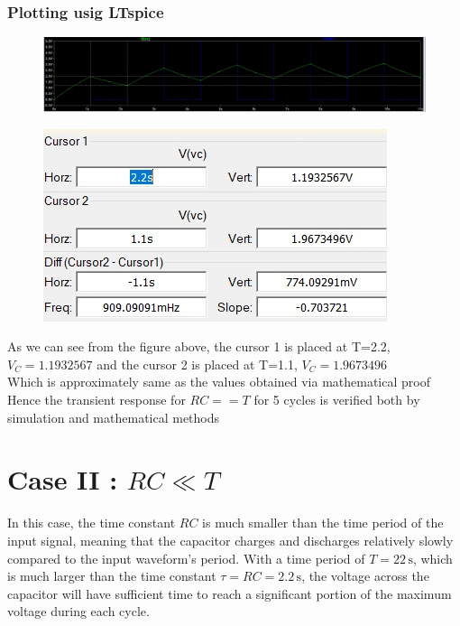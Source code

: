 \documentclass[journal]{IEEEtran}
\begin{document}
\subsubsection{Plotting usig LTspice}
\begin{figure}[H]
    \centering
    \includegraphics[width=\linewidth]{figs/lt1.2.jpeg}
\end{figure}
\begin{figure}[H]
    \centering
    \includegraphics[width=0.7\linewidth]{figs/lt1.3.jpeg}
\end{figure}
As we can see from the figure above, the cursor 1 is placed at T=2.2, $V_C = 1.1932567$ and the cursor 2 is placed at T=1.1, $V_C= 1.9673496$\\
Which is approximately same as the values obtained via mathematical proof \\
Hence the transient response for $RC==T$ for 5 cycles is verified both by simulation and mathematical methods
\section{Case II : \( RC \ll T \)}
In this case, the time constant \( RC \) is much smaller than the time period of the input signal, meaning that the capacitor charges and discharges relatively slowly compared to the input waveform's period. With a time period of \( T = 22 \, \text{s} \), which is much larger than the time constant \( \tau = RC = 2.2 \, \text{s} \), the voltage across the capacitor will have sufficient time to reach a significant portion of the maximum voltage during each cycle.
\end{document}
